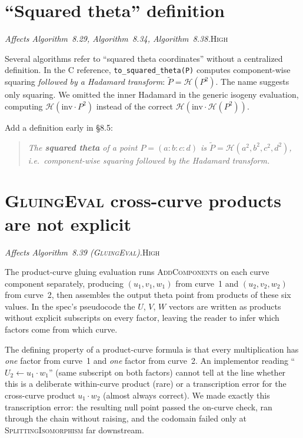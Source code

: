 \documentclass[a4paper,11pt]{article}
\newcommand{\algo}[1]{Algorithm~#1}
\newcommand{\high}{\textsc{\color{BurntOrange}High}}
\newcommand{\finding}[2]{\noindent\textit{#1}\hfill#2\par\smallskip}
\begin{document}
\section{``Squared theta'' definition}
\label{sec:squared-theta}

\finding{Affects \algo{8.29}, \algo{8.34}, \algo{8.38}.}{\high}

Several algorithms refer to ``squared theta coordinates'' without a
centralized definition.  In the C reference,
\texttt{to\_squared\_theta(P)} computes component-wise squaring
\emph{followed by a Hadamard transform}: $\tilde{P} =
\mathcal{H}(P^2)$.  The name suggests only squaring.  We omitted the
inner Hadamard in the generic isogeny evaluation, computing
$\mathcal{H}(\mathrm{inv} \cdot P^2)$ instead of the correct
$\mathcal{H}(\mathrm{inv} \cdot \mathcal{H}(P^2))$.

Add a definition early in \S8.5:
\begin{quote}
  \itshape The \textbf{squared theta} of a point $P = (a:b:c:d)$ is
  $\tilde{P} = \mathcal{H}(a^2, b^2, c^2, d^2)$, i.e.\ component-wise
  squaring followed by the Hadamard transform.
\end{quote}

\section{\textsc{GluingEval} cross-curve products are not explicit}
\label{sec:gluing-eval-cross}

\finding{Affects \algo{8.39} (\textsc{GluingEval}).}{\high}

The product-curve gluing evaluation runs \textsc{AddComponents}
on each curve component separately, producing
$(u_1, v_1, w_1)$ from curve~1 and $(u_2, v_2, w_2)$ from
curve~2, then assembles the output theta point from
products of these six values.  In the spec's pseudocode the
$U$, $V$, $W$ vectors are written as products without explicit
subscripts on every factor, leaving the reader to infer which
factors come from which curve.

The defining property of a product-curve formula is that every
multiplication has \emph{one} factor from curve~1 and \emph{one}
factor from curve~2.  An implementor reading
``$U_2 \leftarrow u_1 \cdot w_1$'' (same subscript on both
factors) cannot tell at the line whether this is a
deliberate within-curve product (rare) or a transcription error
for the cross-curve product $u_1 \cdot w_2$ (almost always
correct).  We made exactly this transcription error: the
resulting null point passed the on-curve check, ran through the
chain without raising, and the codomain failed only at
\textsc{SplittingIsomorphism} far downstream.
\end{document}
